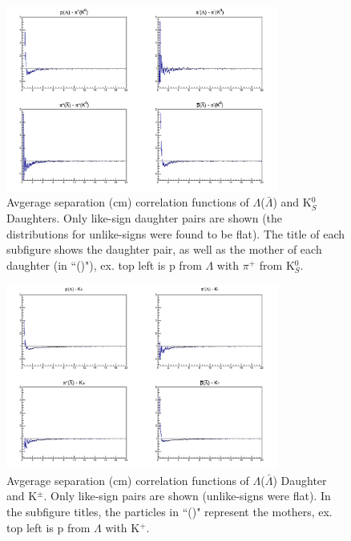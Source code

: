 \documentclass[../AnalysisNoteJBuxton.tex]{subfiles}
\begin{document}
\begin{figure}[h]
  \centering
  \includegraphics[width=0.8\textwidth]{3_DataSelection/Figures/AvgSepCFs_LamK0.pdf}
  \caption[Avgerage Separation of $\Lambda$($\bar{\Lambda}$) and K$^{0}_{S}$ Daughters]{Avgerage separation (cm) correlation functions of $\Lambda$($\bar{\Lambda}$) and K$^{0}_{S}$ Daughters.  Only like-sign daughter pairs are shown (the distributions for unlike-signs were found to be flat).  The title of each subfigure shows the daughter pair, as well as the mother of each daughter (in ``()"),  ex. top left is p from $\Lambda$ with $\pi^{+}$ from K$^{0}_{S}$.}
  \label{fig:AvgSepLamK0}
\end{figure}

\begin{figure}[h]
  \centering
  \includegraphics[width=0.8\textwidth]{3_DataSelection/Figures/AvgSepCFs_LamKch.pdf}
  \caption[Avgerage Separation of $\Lambda$($\bar{\Lambda}$) Daughter and K$^{\pm}$]{Avgerage separation (cm) correlation functions of $\Lambda$($\bar{\Lambda}$) Daughter and K$^{\pm}$.  Only like-sign pairs are shown (unlike-signs were flat).  In the subfigure titles, the particles in ``()" represent the mothers, ex. top left is p from $\Lambda$ with K$^{+}$.}
  \label{fig:AvgSepLamKch}
\end{figure}
\end{document}
